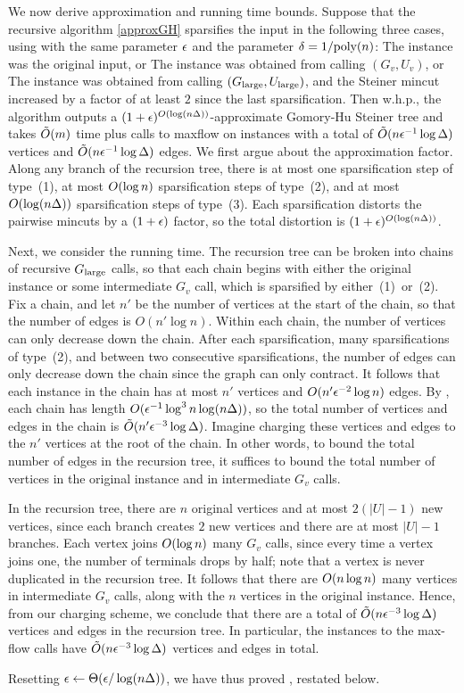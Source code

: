 We now derive approximation and running time bounds.
\BT
Suppose that the recursive algorithm \ref{approxGH} sparsifies the input in the following three cases, using  with the same parameter $\epsilon$ and the parameter $\delta=1/\textup{poly}(n)$:
 \BE
 \im The instance was the original input, or
 \im The instance was obtained from calling $(G_v,U_v)$, or
 \im The instance was obtained from calling $(G_{\textup{large}},U_{\textup{large}})$, and the Steiner mincut increased by a factor of at least $2$ since the last sparsification.
 \EE
Then w.h.p., the algorithm outputs a $(1+\epsilon)^{O(\log(n\Delta))}$-approximate Gomory-Hu Steiner tree and takes $\tilde{O}(m)$ time plus calls to maxflow on instances with a total of $\tilde{O}(n\epsilon^{-1}\log\Delta)$ vertices and $\tilde{O}(n\epsilon^{-1}\log\Delta)$ edges.
\ET
\BP
We first argue about the approximation factor. Along any branch of the recursion tree, there is at most one sparsification step of type~(1), at most $O(\log n)$ sparsification steps of type~(2), and at most $O(\log(n\Delta))$ sparsification steps of type~(3). Each sparsification distorts the pairwise mincuts by a $(1+\epsilon)$ factor, so the total distortion is $(1+\epsilon)^{O(\log(n\Delta))}$.

Next, we consider the running time. The recursion tree can be broken into chains of recursive $G_{\textup{large}}$ calls, so that each chain begins with either the original instance or some intermediate $G_v$ call, which is sparsified by either~(1)~or~(2). Fix a chain, and let $n'$ be the number of vertices at the start of the chain, so that the number of edges is $O(n'\log n)$. Within each chain, the number of vertices can only decrease down the chain. After each sparsification, many sparsifications of type~(2), and between two consecutive sparsifications, the number of edges can only decrease down the chain since the graph can only contract. It follows that each instance in the chain has at most $n'$ vertices and $O(n'\epsilon^{-2}\log n)$ edges. %
By , each chain has length $O(\epsilon^{-1}\log^3n\log(n\Delta))$, so the total number of vertices and edges in the chain is $\tilde{O}(n'\epsilon^{-3}\log\Delta)$. Imagine charging these vertices and edges to the $n'$ vertices at the root of the chain.
In other words, to bound the total number of edges in the recursion tree, it suffices to bound the total number of vertices in the original instance and in intermediate $G_v$ calls. 

In the recursion tree, there are $n$ original vertices and at most $2(|U|-1)$ new vertices, since each branch creates $2$ new vertices and there are at most $|U|-1$ branches. Each vertex joins $O(\log n)$ many $G_v$ calls, since every time a vertex joins one, the number of terminals drops by half; note that a vertex is never duplicated in the recursion tree. It follows that there are $O(n\log n)$ many vertices in intermediate $G_v$ calls, along with the $n$ vertices in the original instance. Hence, from our charging scheme, we conclude that there are a total of $\tilde{O}(n\epsilon^{-3}\log\Delta)$ vertices and edges in the recursion tree. In particular, the instances to the max-flow calls have $\tilde{O}(n\epsilon^{-3}\log\Delta)$ vertices and edges in total.
\EP

Resetting $\epsilon\gets\Theta(\epsilon/\log(n\Delta))$, we have thus proved , restated below.
\ApproxW*



